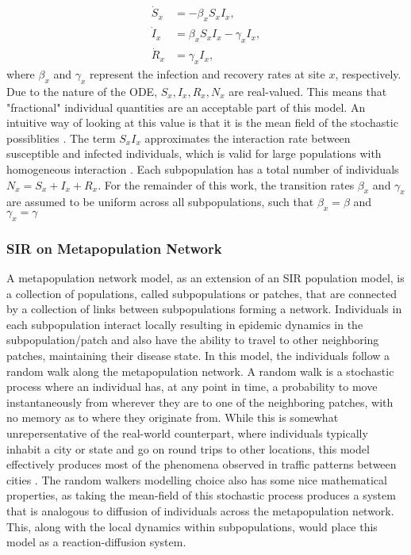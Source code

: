 \begin{equation}
\begin{aligned}
    \dot{S}_{x} &= -\beta_{x} S_{x} I_{x}, \\
    \dot{I}_{x} &= \beta_{x} S_{x} I_{x} - \gamma_{x} I_{x}, \\
    \dot{R}_{x} &= \gamma_{x} I_{x},
\end{aligned}
\end{equation}
where $ \beta_x$ and $ \gamma_x$ represent the infection and recovery rates at site $x$, respectively.\\
Due to the nature of the ODE, $S_x, I_x, R_x, N_x$ are real-valued. This means that "fractional" individual quantities are an acceptable part of this model. An intuitive way of looking at this value is that it is the mean field of the stochastic possiblities \cite{colizza2008epidemic}. The term $S_x I_x$ approximates the interaction rate between susceptible and infected individuals, which is valid for large populations with homogeneous interaction \cite{armbruster2017elementary}.
Each subpopulation has a total number of individuals $ N_x = S_x + I_x + R_x$.
For the remainder of this work, the transition rates $\beta_x$ and $ \gamma_x$ are assumed to be uniform across all subpopulations, such that $\beta_x=\beta$ and $ \gamma_x=\gamma$ \\


\subsubsection{SIR on Metapopulation Network}
A metapopulation network model, as an extension of an SIR population model, is a collection of populations, called subpopulations or patches, that are connected by a collection of links between subpopulations forming a network. Individuals in each subpopulation interact locally resulting in epidemic dynamics in the subpopulation/patch and also have the ability to travel to other neighboring patches, maintaining their disease state. In this model, the individuals follow a random walk along the metapopulation network. A random walk is a stochastic process where an individual has, at any point in time, a probability to move instantaneously from wherever they are to one of the neighboring patches, with no memory as to where they originate from.
While this is somewhat unrepersentative of the real-world counterpart, where individuals typically inhabit a city or state and go on round trips to other locations, this model effectively produces most of the phenomena observed in traffic patterns between cities \cite{shao2022epidemic}.
The random walkers modelling choice also has some nice mathematical properties, as taking the mean-field of this stochastic process produces a system that is analogous to diffusion of individuals across the metapopulation network\cite{masuda2017random}.
This, along with the local dynamics within subpopulations, would place this model as a reaction-diffusion system\cite{colizza2007reaction}.\\


